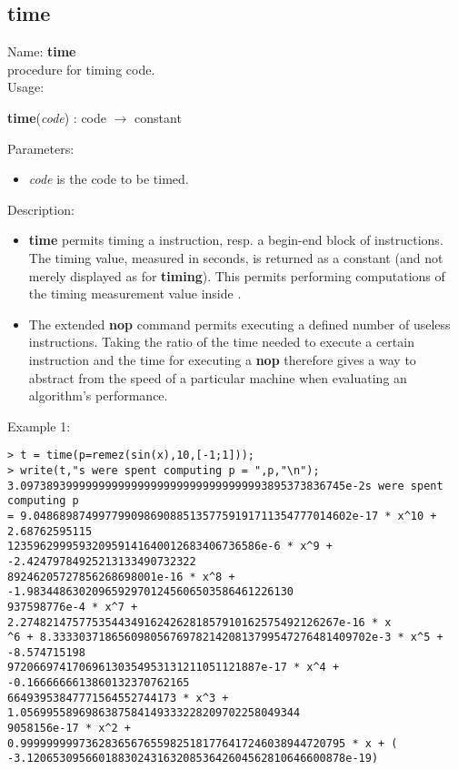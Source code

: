 \subsection{time}
\label{labtime}
\noindent Name: \textbf{time}\\
\phantom{aaa}procedure for timing \sollya code.\\[0.2cm]
\noindent Usage: 
\begin{center}
\textbf{time}(\emph{code}) : \textsf{code} $\rightarrow$ \textsf{constant}\\
\end{center}
Parameters: 
\begin{itemize}
\item \emph{code} is the code to be timed.
\end{itemize}
\noindent Description: \begin{itemize}

\item \textbf{time} permits timing a \sollya instruction, resp. a begin-end block
   of \sollya instructions. The timing value, measured in seconds, is returned
   as a \sollya constant (and not merely displayed as for \textbf{timing}). This 
   permits performing computations of the timing measurement value inside \sollya.

\item The extended \textbf{nop} command permits executing a defined number of
   useless instructions. Taking the ratio of the time needed to execute a
   certain \sollya instruction and the time for executing a \textbf{nop}
   therefore gives a way to abstract from the speed of a particular 
   machine when evaluating an algorithm's performance.
\end{itemize}
\noindent Example 1: 
\begin{center}\begin{minipage}{15cm}\begin{Verbatim}[frame=single]
> t = time(p=remez(sin(x),10,[-1;1]));
> write(t,"s were spent computing p = ",p,"\n");
3.09738939999999999999999999999999999993895373836745e-2s were spent computing p 
= 9.0486898749977990986908851357759191711354777014602e-17 * x^10 + 2.68762595115
123596299959320959141640012683406736586e-6 * x^9 + -2.42479784925213133490732322
89246205727856268698001e-16 * x^8 + -1.98344863020965929701245606503586461226130
937598776e-4 * x^7 + 2.2748214757753544349162426281857910162575492126267e-16 * x
^6 + 8.3333037186560980567697821420813799547276481409702e-3 * x^5 + -8.574715198
972066974170696130354953131211051121887e-17 * x^4 + -0.1666666613860132370762165
66493953847771564552744173 * x^3 + 1.0569955896986387584149333228209702258049344
9058156e-17 * x^2 + 0.99999999973628365676559825181776417246038944720795 * x + (
-3.1206530956601883024316320853642604562810646600878e-19)
\end{Verbatim}
\end{minipage}\end{center}
